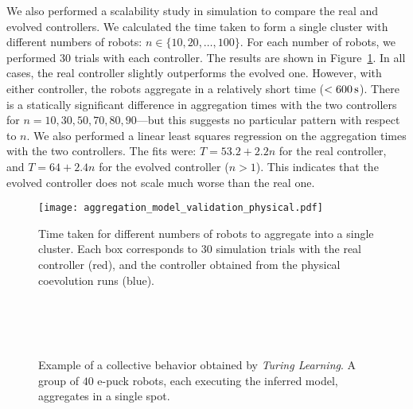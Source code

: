 We also performed a scalability study in simulation to compare the real and evolved controllers. We calculated the time taken to form a single cluster with different numbers of robots: $n \in \lbrace10, 20, \dots, 100\rbrace$. For each number of robots, we performed $30$ trials with each controller. The results are shown in Figure~\ref{fig:aggregation_model_validation_physical}. In all cases, the real controller slightly outperforms the evolved one.
However, with either controller, the robots aggregate in a relatively short time ($<\unit[600]{s}$). There is a statically significant difference in aggregation times with the two controllers for $n= 10, 30, 50, 70, 80, 90$---but this suggests no particular pattern with respect to $n$. We also performed a linear least squares regression on the aggregation times with the two controllers. The fits were: $T = 53.2 + 2.2n$ for the real controller, and $T = 64 + 2.4n$ for the evolved controller ($n>1$). This indicates that the evolved controller does not scale much worse than the real one.

\begin{figure}[!t]
	\centering
	\texttt{[image: aggregation\_model\_validation\_physical.pdf]}
	\caption{Time taken for different numbers of robots to aggregate into a single cluster. Each box corresponds to $30$ 			    simulation trials with the real controller (red), and the controller obtained from the physical coevolution runs (blue).}
	\label{fig:aggregation_model_validation_physical}
\end{figure}

\captionsetup[subfigure]{labelformat=empty}  
\begin{figure*}[!t]
	\centering
	\\
	\\
	\\
	\caption{Example of a collective behavior obtained by \textit{Turing Learning}. A group of $40$ e-puck robots, each executing the inferred model, aggregates in a single spot.}%
	\label{fig:aggregation_snapshoot_physical_validation}
\end{figure*}

